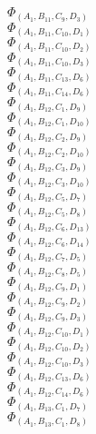 \documentclass[14pt]{article}
\begin{document}
    $\Phi_{({A}_{1}, {B}_{11}, {C}_{9}, {D}_{3})}$ \\ 
    $\Phi_{({A}_{1}, {B}_{11}, {C}_{10}, {D}_{1})}$ \\ 
    $\Phi_{({A}_{1}, {B}_{11}, {C}_{10}, {D}_{2})}$ \\ 
    $\Phi_{({A}_{1}, {B}_{11}, {C}_{10}, {D}_{3})}$ \\ 
    $\Phi_{({A}_{1}, {B}_{11}, {C}_{13}, {D}_{6})}$ \\ 
    $\Phi_{({A}_{1}, {B}_{11}, {C}_{14}, {D}_{6})}$ \\ 
    $\Phi_{({A}_{1}, {B}_{12}, {C}_{1}, {D}_{9})}$ \\ 
    $\Phi_{({A}_{1}, {B}_{12}, {C}_{1}, {D}_{10})}$ \\ 
    $\Phi_{({A}_{1}, {B}_{12}, {C}_{2}, {D}_{9})}$ \\ 
    $\Phi_{({A}_{1}, {B}_{12}, {C}_{2}, {D}_{10})}$ \\ 
    $\Phi_{({A}_{1}, {B}_{12}, {C}_{3}, {D}_{9})}$ \\ 
    $\Phi_{({A}_{1}, {B}_{12}, {C}_{3}, {D}_{10})}$ \\ 
    $\Phi_{({A}_{1}, {B}_{12}, {C}_{5}, {D}_{7})}$ \\ 
    $\Phi_{({A}_{1}, {B}_{12}, {C}_{5}, {D}_{8})}$ \\ 
    $\Phi_{({A}_{1}, {B}_{12}, {C}_{6}, {D}_{13})}$ \\ 
    $\Phi_{({A}_{1}, {B}_{12}, {C}_{6}, {D}_{14})}$ \\ 
    $\Phi_{({A}_{1}, {B}_{12}, {C}_{7}, {D}_{5})}$ \\ 
    $\Phi_{({A}_{1}, {B}_{12}, {C}_{8}, {D}_{5})}$ \\ 
    $\Phi_{({A}_{1}, {B}_{12}, {C}_{9}, {D}_{1})}$ \\ 
    $\Phi_{({A}_{1}, {B}_{12}, {C}_{9}, {D}_{2})}$ \\ 
    $\Phi_{({A}_{1}, {B}_{12}, {C}_{9}, {D}_{3})}$ \\ 
    $\Phi_{({A}_{1}, {B}_{12}, {C}_{10}, {D}_{1})}$ \\ 
    $\Phi_{({A}_{1}, {B}_{12}, {C}_{10}, {D}_{2})}$ \\ 
    $\Phi_{({A}_{1}, {B}_{12}, {C}_{10}, {D}_{3})}$ \\ 
    $\Phi_{({A}_{1}, {B}_{12}, {C}_{13}, {D}_{6})}$ \\ 
    $\Phi_{({A}_{1}, {B}_{12}, {C}_{14}, {D}_{6})}$ \\ 
    $\Phi_{({A}_{1}, {B}_{13}, {C}_{1}, {D}_{7})}$ \\ 
    $\Phi_{({A}_{1}, {B}_{13}, {C}_{1}, {D}_{8})}$ \\ 
\end{document}
